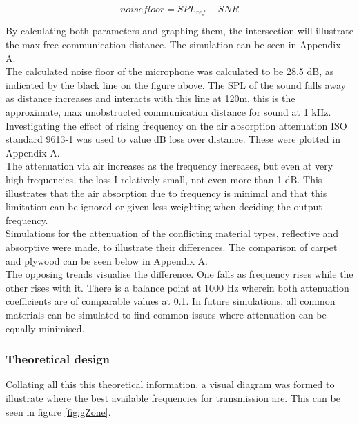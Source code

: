 \begin{equation}
noise floor = SPL_{ref}-SNR
\end{equation}

By calculating both parameters and graphing them, the intersection will illustrate the max free communication distance. The simulation can be seen in Appendix A. \\

The calculated noise floor of the microphone was calculated to be 28.5 dB, as indicated by the black line on the figure above. The SPL of the sound falls away as distance increases and interacts with this line at 120m. this is the approximate, max unobstructed communication distance for sound at 1 kHz. \\

Investigating the effect of rising frequency on the air absorption attenuation ISO standard 9613-1  \cite{int93} was used to value dB loss over distance. These were plotted in Appendix A. \\

The attenuation via air increases as the frequency increases, but even at very high frequencies, the loss I relatively small, not even more than 1 dB. This illustrates that the air absorption due to frequency is minimal and that this limitation can be ignored or given less weighting when deciding the output frequency. \\

Simulations for the attenuation of the conflicting material types, reflective and absorptive were made, to illustrate their differences. The comparison of carpet and plywood can be seen below in Appendix A. \\ 

The opposing trends visualise the difference. One falls as frequency rises while the other rises with it. There is a balance point at 1000 Hz wherein both attenuation coefficients are of comparable values at 0.1. In future simulations, all common materials can be simulated to find common issues where attenuation can be equally minimised.

\subsubsection{Theoretical design}

Collating all this this theoretical information, a visual diagram was formed to illustrate where the best available frequencies for transmission are. This can be seen in figure \ref{fig:gZone}. 

